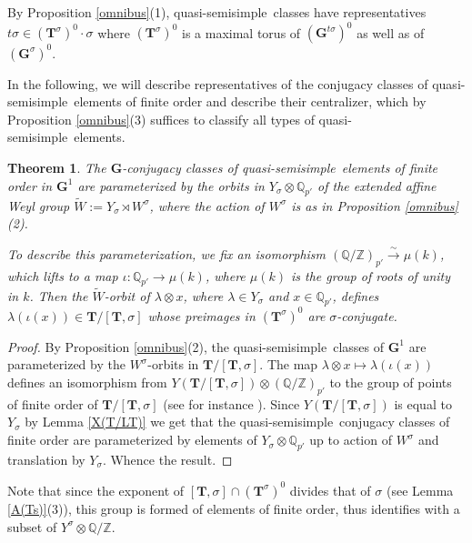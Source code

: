 \documentclass{amsart}
\newtheorem{theorem}[equation]{Theorem}
\numberwithin{equation}{section}
\theoremstyle{definition}
\theoremstyle{remark}
\newcommand\bG{{\mathbf G}}
\newcommand\bT{{\mathbf T}}
\newcommand\BQ{{\mathbb Q}}
\newcommand\BZ{{\mathbb Z}}
\newcommand\Gun{{\bG^1}}
\newcommand\Gtso{{(\bG^{t\sigma})^0}}
\newcommand\Gs{{\bG^\sigma}}
\newcommand\Gso{{(\Gs)^0}}
\newcommand\Tso{{(\bT^\sigma)^0}}
\newcommand\LT{{\bT/[\bT,\sigma]}}
\newcommand\tW{{\widetilde W}}
\newcommand\qss{quasi-semisimple}
\begin{document}
By  Proposition \ref{omnibus}(1),    \qss\    classes   have   representatives
$t\sigma\in\Tso\cdot\sigma$  where $\Tso$ is a  maximal torus of $\Gtso$ as
well  as of  $\Gso$. 

In the following, we will describe
representatives  of the  conjugacy classes  of \qss\ elements of
finite  order and  describe their  centralizer, 
which by Proposition \ref{omnibus}(3) suffices to
classify all types of \qss\ elements.

\begin{theorem}\label{parametrization}
\index{Wtilde@$\tW$}
The $\bG$-conjugacy classes of \qss\ elements of finite order in
$\Gun$  are  parameterized  by  the  orbits in $Y_\sigma\otimes\BQ_{p'}$ of 
the  extended affine Weyl group  $\tW:=Y_\sigma\rtimes W^\sigma$, where the
action of $W^\sigma$ is as in Proposition \ref{omnibus}(2).

To describe this parameterization, we fix an isomorphism
$(\BQ/\BZ)_{p'}\xrightarrow\sim \mu(k)$, which lifts to a map
$\iota:\BQ_{p'}\to\mu(k)$,
where $\mu(k)$ is the group of roots of unity in $k$. Then 
the $\tW$-orbit of $\lambda\otimes x$, where $\lambda\in Y_\sigma$ and 
$x\in\BQ_{p'}$, defines $\lambda(\iota(x))\in\LT$ whose preimages
in $\Tso$ are $\sigma$-conjugate.
\end{theorem}
\begin{proof}
By   Proposition \ref{omnibus}(2),   the   \qss\   classes   of  $\Gun$  are
parameterized  by the $W^\sigma $-orbits  in $\LT$. The map $\lambda\otimes
x\mapsto \lambda(\iota(x))$ defines an isomorphism from
$Y(\LT)\otimes(\BQ/\BZ)_{p'}$  to the  group of  points of  finite order of
$\LT$   (see  for instance \cite[0.20]{book}).   Since   $Y(\LT)$  is  equal  to
$Y_\sigma$  by Lemma  \ref{X(T/LT)} we  get that  the \qss\ 
conjugacy  classes  of  finite  order  are  parameterized  by  elements  of
$Y_\sigma\otimes\BQ_{p'}$  up to action of $W^\sigma$ and translation by
$Y_\sigma$. Whence the result.
\end{proof}
Note that since the exponent of $[\bT,\sigma]\cap\Tso$  divides that of
$\sigma$ (see Lemma \ref{A(Ts)}(3)), this group is formed of elements of
finite order, thus identifies with a subset of $Y^\sigma\otimes\BQ/\BZ$.
\end{document}
